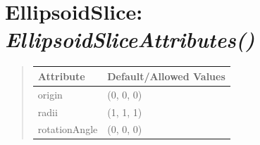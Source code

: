 \documentclass[letterpaper,10pt,english]{sphinxmanual}
\begin{document}
\section{\textbf{EllipsoidSlice}: \emph{EllipsoidSliceAttributes()}}
\label{attributes:ellipsoidslice-ellipsoidsliceattributes}
\begin{DUlineblock}{0em}
\item[] 
\end{DUlineblock}
\begin{quote}

\begin{tabulary}{\linewidth}{|L|L|}
\hline

\textbf{Attribute}
 & 
\textbf{Default/Allowed Values}
\\
\hline
origin
 & 
(0, 0, 0)
\\
\hline
radii
 & 
(1, 1, 1)
\\
\hline
rotationAngle
 & 
(0, 0, 0)
\\
\hline\end{tabulary}

\end{quote}

\begin{DUlineblock}{0em}
\item[] 
\end{DUlineblock}

\begin{DUlineblock}{0em}
\item[] 
\end{DUlineblock}
\end{document}
